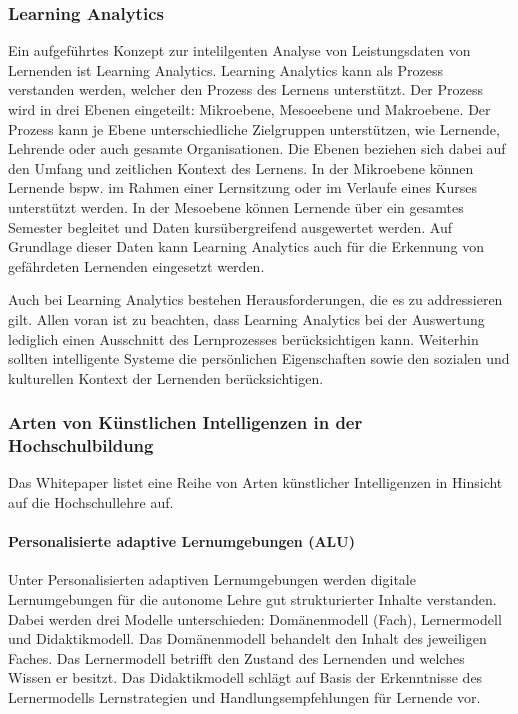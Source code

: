 \subsubsection*{Learning Analytics}
Ein aufgeführtes Konzept zur intelilgenten Analyse von Leistungsdaten von Lernenden ist Learning Analytics. Learning Analytics kann als Prozess verstanden werden, welcher den Prozess des Lernens unterstützt. Der Prozess wird in drei Ebenen eingeteilt: Mikroebene, Mesoeebene und Makroebene. Der Prozess kann je Ebene unterschiedliche Zielgruppen unterstützen, wie Lernende, Lehrende oder auch gesamte Organisationen. Die Ebenen beziehen sich dabei auf den Umfang und zeitlichen Kontext des Lernens. In der Mikroebene können Lernende bspw. im Rahmen einer Lernsitzung oder im Verlaufe eines Kurses unterstützt werden. In der Mesoebene können Lernende über ein gesamtes Semester begleitet und Daten kursübergreifend ausgewertet werden. Auf Grundlage dieser Daten kann Learning Analytics auch für die Erkennung von gefährdeten Lernenden eingesetzt werden. \cite*[S. 14ff.]{Witt.2020}

Auch bei Learning Analytics bestehen Herausforderungen, die es zu addressieren gilt. Allen voran ist zu beachten, dass Learning Analytics bei der Auswertung lediglich einen Ausschnitt des Lernprozesses berücksichtigen kann. Weiterhin sollten intelligente Systeme die persönlichen Eigenschaften sowie den sozialen und kulturellen Kontext der Lernenden berücksichtigen. \cite*[S. 16]{Witt.2020}

\subsubsection*{Arten von Künstlichen Intelligenzen in der Hochschulbildung}
Das Whitepaper listet eine Reihe von Arten künstlicher Intelligenzen in Hinsicht auf die Hochschullehre auf.
\paragraph*{Personalisierte adaptive Lernumgebungen (ALU)}
Unter Personalisierten adaptiven Lernumgebungen werden digitale Lernumgebungen für die autonome Lehre gut strukturierter Inhalte verstanden. Dabei werden drei Modelle unterschieden: Domänenmodell (Fach), Lernermodell und Didaktikmodell. Das Domänenmodell behandelt den Inhalt des jeweiligen Faches. Das Lernermodell betrifft den Zustand des Lernenden und welches Wissen er besitzt. Das Didaktikmodell schlägt auf Basis der Erkenntnisse des Lernermodells Lernstrategien und Handlungsempfehlungen für Lernende vor. \cite*[S. 17f.]{Witt.2020}

